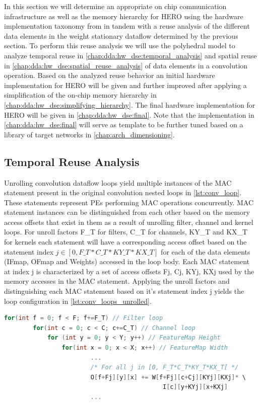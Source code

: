 In this section we will determine an appropriate on chip communication
infrastructure as well as the memory hierarchy for HERO using the hardware
implementation taxonomy from \cite{maestro} in tandem with a reuse analysis of
the different data elements in the weight stationary dataflow determined by the
previous section. To perform this reuse analysis we will use the polyhedral
model to analyze temporal reuse in \autoref{chap:dda:hw_dse:temporal_analysis}
and spatial reuse in \autoref{chap:dda:hw_dse:spatial_reuse_analysis} of data
elements in a convolution operation. Based on the analyzed reuse behavior an
initial hardware implementation for HERO will be given and further improved
after applying a simplification of the on-chip memory hierarchy in
\autoref{chap:dda:hw_dse:simplifying_hierarchy}. The final hardware
implementation for HERO will be given in \autoref{chap:dda:hw_dse:final}. Note
that the implementation in \autoref{chap:dda:hw_dse:final} will serve as
template to be further tuned based on a library of target networks in
\autoref{chap:arch_dimensioning}.  

\subsection{Temporal Reuse Analysis}
\label{chap:dda:hw_dse:temporal_analysis}

Unrolling convolution dataflow loops yield multiple instances of the \ac{MAC}
statement present in the original convolution nested loops in
\autoref{lst:conv_loop}. These statements represent \ac{PE}s performing MAC
operations concurrently. 
\ac{MAC} statement instances can be distinguished from each other based on the memory access offsets that
exist in them as a result of unrolling filter, channel and kernel loops. For
unroll factors F\_T for filters, C\_T for channels, KY\_T and KX\_T for kernels
each statement will have a corresponding access offset based on the statement
index $j \in [0, F\_T*C\_T*KY\_T*KX\_T]$ for each of the data elements
(IFmap, OFmap and Weights) accessed in the loop body. Each \ac{MAC} statement
at index j is characterized by a set of access offsets {Fj, Cj, KYj,
KXj} used by the memory accesses in the \ac{MAC} statement. Applying the unroll
factors and distinguishing each \ac{MAC} statement based on it's statement index
j yields the loop configuration in \autoref{lst:conv_loops_unrolled}. 

\clearpage 

\begin{lstlisting}[language=C, caption=Fully unrolled convolution dataflow loops, label={lst:conv_loops_unrolled}]
    for(int f = 0; f < F; f+=F_T) // Filter loop
        for(int c = 0; c < C; c+=C_T) // Channel loop
            for (int y = 0; y < Y; y++) // FeatureMap Height
                for(int x = 0; x < X; x++) // FeatureMap Width
                        ...
                        /* For all j in [0, F_T*C_T*KY_T*KX_T[ */ 
                        O[f+Fj][y][x] += W[f+Fj][c+Cj][KYj][KXj]* \
                                            I[c][y+KYj][x+KXj] 
                        ...
\end{lstlisting}

